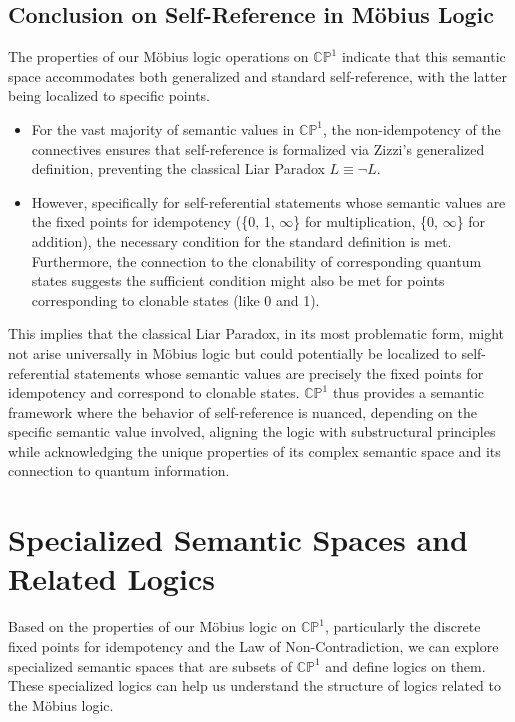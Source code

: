 \documentclass{article}
\begin{document}
	\subsection{Conclusion on Self-Reference in Möbius Logic}
	
	The properties of our M\"{o}bius logic operations on \(\mathbb{CP}^1\) indicate that this semantic space accommodates both generalized and standard self-reference, with the latter being localized to specific points.
	
	\begin{itemize}
		\item For the vast majority of semantic values in \(\mathbb{CP}^1\), the non-idempotency of the connectives ensures that self-reference is formalized via Zizzi's generalized definition, preventing the classical Liar Paradox \(L \equiv \neg L\).
		\item However, specifically for self-referential statements whose semantic values are the fixed points for idempotency (\{0, 1, \(\infty\)\} for multiplication, \{0, \(\infty\)\} for addition), the necessary condition for the standard definition is met. Furthermore, the connection to the clonability of corresponding quantum states suggests the sufficient condition might also be met for points corresponding to clonable states (like 0 and 1).
	\end{itemize}
	This implies that the classical Liar Paradox, in its most problematic form, might not arise universally in M\"{o}bius logic but could potentially be localized to self-referential statements whose semantic values are precisely the fixed points for idempotency and correspond to clonable states. \(\mathbb{CP}^1\) thus provides a semantic framework where the behavior of self-reference is nuanced, depending on the specific semantic value involved, aligning the logic with substructural principles while acknowledging the unique properties of its complex semantic space and its connection to quantum information.
	
	\section{Specialized Semantic Spaces and Related Logics}
	
	Based on the properties of our M\"{o}bius logic on $\mathbb{CP}^1$, particularly the discrete fixed points for idempotency and the Law of Non-Contradiction, we can explore specialized semantic spaces that are subsets of $\mathbb{CP}^1$ and define logics on them. These specialized logics can help us understand the structure of logics related to the M\"{o}bius logic.
	
\end{document}
